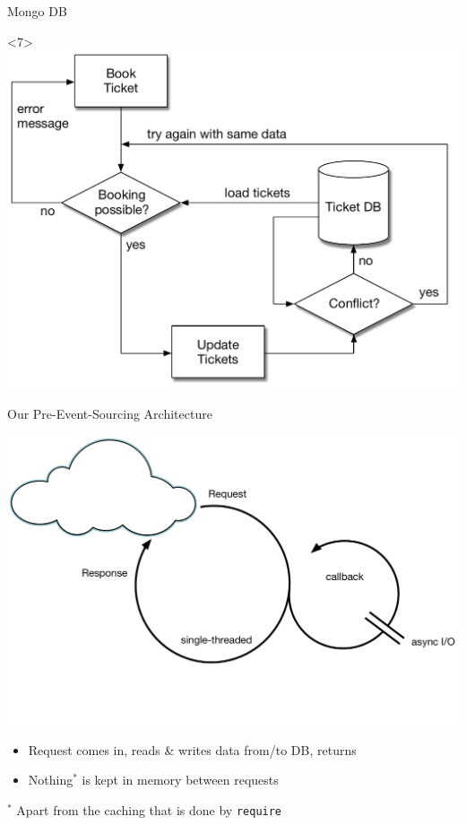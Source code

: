 \begin{frame}[fragile]{Mongo DB}
\begin{center}
\begin{onlyenv}<7>
\includegraphics[width=.85\textwidth]{../OptimisticLocking7.pdf}
\end{onlyenv}

\end{center}

\end{frame}

\begin{frame}[fragile]{Our Pre-Event-Sourcing Architecture}

\includegraphics[width=.7\textwidth]{../Nodejs3.pdf}

\begin{itemize}
\item Request comes in, reads \& writes data from/to DB, returns
\item Nothing$^*$ is kept in memory between requests
\end{itemize}

{ \tiny $^*$ Apart from the caching that is done by \texttt{require} }
\end{frame}

